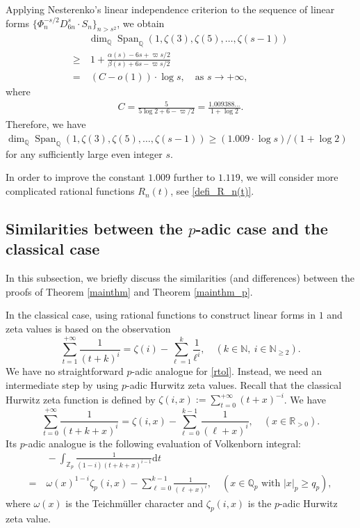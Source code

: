 \documentclass[12pt]{article}
\numberwithin{equation}{section}
\begin{document}
Applying Nesterenko's linear independence criterion to the sequence of linear forms $ \{ \Phi_{n}^{-s/2}D_{6n}^s \cdot S_n\}_{n > s^2}$, we obtain
\begin{align*}
&\dim_{\mathbb{Q}}\operatorname{Span}_{\mathbb{Q}}\left( 1,\zeta(3),\zeta(5),\ldots,\zeta(s-1) \right) \\
\geqslant&~ 1 + \frac{\alpha(s) - 6s + \varpi s/2}{\beta(s) + 6s - \varpi s/2} \\
=&~ (C - o(1)) \cdot \log s, \quad \text{as~} s \to +\infty,
\end{align*}
where
\begin{align*}
C = \frac{5}{5\log 2 + 6-\varpi/2} = \frac{1.009388\ldots}{1+\log 2}.
\end{align*}
Therefore, we have $\dim_{\mathbb{Q}}\operatorname{Span}_{\mathbb{Q}}\left( 1,\zeta(3),\zeta(5),\ldots,\zeta(s-1) \right) \geqslant (1.009\cdot \log s)/(1+\log 2)$ for any sufficiently large even integer $s$. 

In order to improve the constant $1.009$ further to $1.119$, we will consider more complicated rational functions $R_n(t)$, see \eqref{defi_R_n(t)}.

\subsection{Similarities between the $p$-adic case and the classical case}

In this subsection, we briefly discuss the similarities (and differences) between the proofs of Theorem \ref{mainthm} and Theorem \ref{mainthm_p}. 

In the classical case, using rational functions to construct linear forms in $1$ and zeta values is based on the observation
\begin{equation}\label{rtol}
\sum_{t=1}^{+\infty} \frac{1}{(t+k)^i} = \zeta(i) - \sum_{\ell=1}^{k} \frac{1}{\ell^i}, \quad(k \in \mathbb{N},~i \in \mathbb{N}_{\geqslant 2}).
\end{equation} 
We have no straightforward $p$-adic analogue for \eqref{rtol}. Instead, we need an intermediate step by using $p$-adic Hurwitz zeta values. Recall that the classical Hurwitz zeta function is defined by $\zeta(i,x) := \sum_{t = 0}^{+\infty} (t+x)^{-i}$. We have
\[ \sum_{t=0}^{+\infty} \frac{1}{(t+k+x)^i} = \zeta(i,x) - \sum_{\ell=0}^{k-1} \frac{1}{(\ell+x)^i}, \quad(x \in \mathbb{R}_{>0}). \]
Its $p$-adic analogue is the following evaluation of  Volkenborn integral:
\begin{align*}
 &~ -\int_{\mathbb{Z}_p} \frac{1}{(1-i)(t+k+x)^{i-1}}\mathrm{d}t \\
 =&~ \omega(x)^{1-i}\zeta_p(i,x) - \sum_{\ell=0}^{k-1} \frac{1}{(\ell+x)^i}, \quad (x \in \mathbb{Q}_{p} \text{~with~} |x|_p \geqslant q_p),
\end{align*}
where $\omega(x)$ is the Teichm\"uller character and $\zeta_p(i,x)$ is the $p$-adic Hurwitz zeta value.
\end{document}
